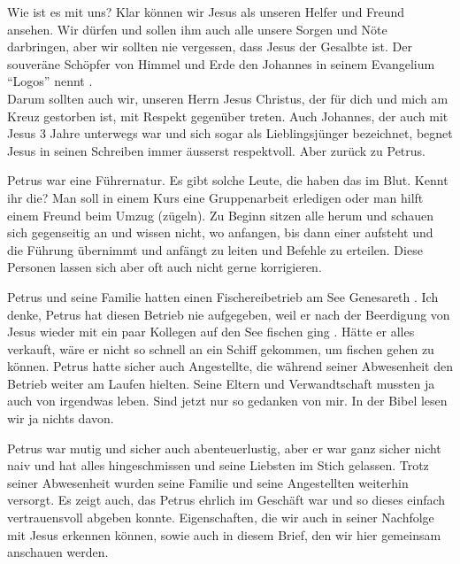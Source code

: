 \documentclass[fontsize=16pt]{mybib}
\begin{document}
Wie ist es mit uns? Klar können wir Jesus als unseren Helfer und Freund ansehen. Wir dürfen und sollen ihm auch alle unsere Sorgen und Nöte darbringen, aber wir sollten nie vergessen, dass Jesus der Gesalbte ist. Der souveräne Schöpfer von Himmel und Erde den Johannes in seinem Evangelium \enquote{Logos} nennt .\\
Darum sollten auch wir, unseren Herrn Jesus Christus, der für dich und mich am Kreuz gestorben ist, mit Respekt gegenüber treten. Auch Johannes, der auch mit Jesus 3 Jahre unterwegs war und sich sogar als Lieblingsjünger bezeichnet, begnet Jesus in seinen Schreiben immer äusserst respektvoll. Aber zurück zu Petrus.

Petrus war eine Führernatur. Es gibt solche Leute, die haben das im Blut. Kennt ihr die? Man soll in einem Kurs eine Gruppenarbeit erledigen oder man hilft einem Freund beim Umzug (zügeln). Zu Beginn sitzen alle herum und schauen sich gegenseitig an und wissen nicht, wo anfangen, bis dann einer aufsteht und die Führung übernimmt und anfängt zu leiten und Befehle zu erteilen. Diese Personen lassen sich aber oft auch nicht gerne korrigieren.

Petrus und seine Familie hatten einen Fischereibetrieb am See Genesareth . Ich denke, Petrus hat diesen Betrieb nie aufgegeben, weil er nach der Beerdigung von Jesus wieder mit ein paar Kollegen auf den See fischen ging . Hätte er alles verkauft, wäre er nicht so schnell an ein Schiff gekommen, um fischen gehen zu können. Petrus hatte sicher auch Angestellte, die während seiner Abwesenheit den Betrieb weiter am Laufen hielten. Seine Eltern und Verwandtschaft mussten ja auch von irgendwas leben. Sind jetzt nur so gedanken von mir. In der Bibel lesen wir ja nichts davon.

Petrus war mutig und sicher auch abenteuerlustig, aber er war ganz sicher nicht naiv und hat alles hingeschmissen und seine Liebsten im Stich gelassen. Trotz seiner Abwesenheit wurden seine Familie und seine Angestellten weiterhin versorgt. Es zeigt auch, das Petrus ehrlich im Geschäft war und so dieses einfach vertrauensvoll abgeben konnte. 
Eigenschaften, die wir auch in seiner Nachfolge mit Jesus erkennen können, sowie auch in diesem Brief, den wir hier gemeinsam anschauen werden.
\end{document}
